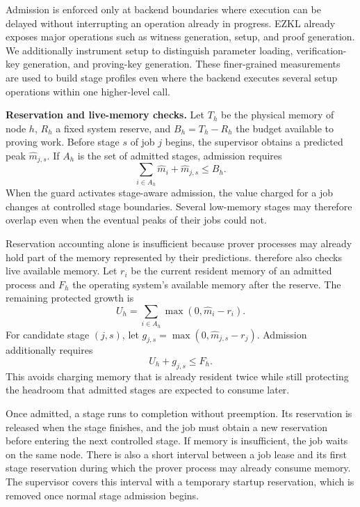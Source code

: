 Admission is enforced only at backend boundaries where execution can be delayed without interrupting an operation already in progress. EZKL already exposes major operations such as witness generation, setup, and proof generation. We additionally instrument setup to distinguish parameter loading, verification-key generation, and proving-key generation. These finer-grained measurements are used to build stage profiles even where the backend executes several setup operations within one higher-level call.

\textbf{Reservation and live-memory checks.}
Let \(T_h\) be the physical memory of node \(h\), \(R_h\) a fixed system reserve, and \(B_h=T_h-R_h\) the budget available to proving work. Before stage \(s\) of job \(j\) begins, the supervisor obtains a predicted peak \(\widehat{m}_{j,s}\). If \(A_h\) is the set of admitted stages, admission requires
\begin{equation}
    \sum_{i\in A_h}\widehat{m}_i+\widehat{m}_{j,s}\leq B_h.
    \label{eq:stage-reservation}
\end{equation}
When the guard activates stage-aware admission, the value charged for a job changes at controlled stage boundaries. Several low-memory stages may therefore overlap even when the eventual peaks of their jobs could not.

Reservation accounting alone is insufficient because prover processes may already hold part of the memory represented by their predictions. \TITLE{} therefore also checks live available memory. Let \(r_i\) be the current resident memory of an admitted process and \(F_h\) the operating system's available memory after the reserve. The remaining protected growth is
\begin{equation}
    U_h=\sum_{i\in A_h}\max(0,\widehat{m}_i-r_i).
    \label{eq:unconsumed-reservations}
\end{equation}
For candidate stage \((j,s)\), let \(g_{j,s}=\max(0,\widehat{m}_{j,s}-r_j)\). Admission additionally requires
\begin{equation}
    U_h+g_{j,s}\leq F_h.
    \label{eq:stage-live-memory}
\end{equation}
This avoids charging memory that is already resident twice while still protecting the headroom that admitted stages are expected to consume later.

Once admitted, a stage runs to completion without preemption. Its reservation is released when the stage finishes, and the job must obtain a new reservation before entering the next controlled stage. If memory is insufficient, the job waits on the same node. There is also a short interval between a job lease and its first stage reservation during which the prover process may already consume memory. The supervisor covers this interval with a temporary startup reservation, which is removed once normal stage admission begins.

